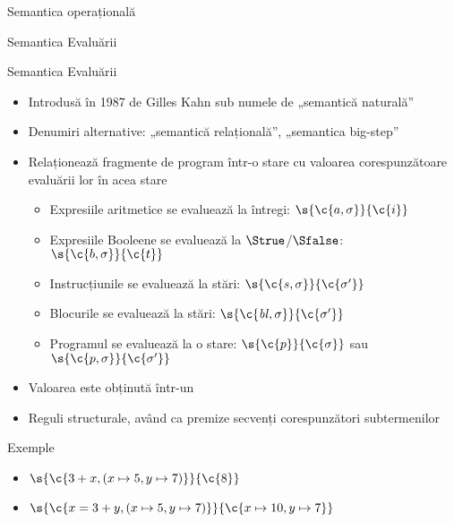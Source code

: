 \documentclass[xcolor=pdftex,romanian,colorlinks]{beamer}
\begin{document}
\begin{section}{Semantica operațională}
\begin{subsection}{Semantica Evaluării}
\begin{frame}{Semantica Evaluării}
\begin{itemize}
\item Introdusă în 1987 de Gilles Kahn sub numele de „semantică naturală”
\item Denumiri alternative: „semantică relațională”, „semantica big-step”
\item Relaționează fragmente de program într-o stare  cu valoarea corespunzătoare evaluării lor în acea stare
\begin{itemize}
\item Expresiile aritmetice se evaluează la întregi: $\s{\c{a,\sigma}}{\c{i}}$
\item Expresiile Booleene se evaluează la $\Strue$/$\Sfalse$: $\s{\c{b,\sigma}}{\c{t}}$
\item Instrucțiunile se evaluează la stări: $\s{\c{s,\sigma}}{\c{\sigma'}}$
\item Blocurile se evaluează la stări: $\s{\c{{\it bl},\sigma}}{\c{\sigma'}}$
\item Programul se evaluează la o stare: $\s{\c{p}}{\c{\sigma}}$ sau $\s{\c{p,\sigma}}{\c{\sigma'}}$
\end{itemize}
\item Valoarea este obținută într-un 
\item Reguli structurale, având ca premize secvenți corespunzători subtermenilor
\end{itemize}

\begin{block}{Exemple}
\begin{itemize}
\item $\s{\c{3 + x, (x\mapsto 5, y\mapsto 7)}}{\c{8}}$
\item $\s{\c{x = 3 + y, (x\mapsto 5, y\mapsto 7)}}{\c{x\mapsto 10, y\mapsto 7}}$
\end{itemize}
\end{block}
\end{frame}


\end{subsection}
\end{section}
\end{document}
